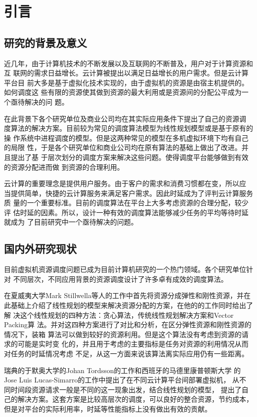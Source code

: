 

\chapter{引言}
\label{chap:introduction}


\section{研究的背景及意义}
近几年，由于计算机技术的不断发展以及互联网的不断普及，用户对于计算资源和互
联网的需求日益增长。云计算被提出以满足日益增长的用户需求。但是云计算平台目
前大多是基于虚拟化技术实现的，由于虚拟机的资源是由宿主机提供的。如何调度这
些有限的资源使其做到资源的最大利用或是资源间的分配公平成为一个亟待解决的问
题。

在此背景下各个研究单位及商业公司均在其实际应用条件下提出了自己的资源调
度算法的解决方案。目前较为常见的调度算法模型为线性规划模型或是基于原有的操
作系统中进程调度的模型。但是这两种常见的模型在多机虚拟环境下均有自己的局限
性，于是各个研究单位和商业公司均在原有算法的基础上做出了改进。并且提出了基
于层次划分的调度方案来解决这些问题。使得调度平台能够做到有效的资源分配进而做
到资源的合理利用。

云计算的重要理念是提供用户服务。由于客户的需求和消费习惯都在变，所以应
当提供简单，快捷的云计算服务来满足客户需求。因此时延成为了评判云计算服务质
量的一个重要标准。目前的调度算法在平台上大多考虑资源的合理分配，较少评
估时延的因素。所以，设计一种有效的调度算法能够减少任务的平均等待时延就成为
了目前研究中一个亟待解决的问题。

\section{国内外研究现状}
目前虚拟机资源调度问题已成为目前计算机研究的一个热门领域。各个研究单位针对
不同层次，不同应用背景的资源调度设计了许多卓有成效的调度算法。

在夏威夷大学Mark Stillwella等人的工作中首先将资源分成弹性和刚性资源，并在
此基础上介绍了线性规划的模型来解决资源分配的方案，在他的的工作同时给出了解
决这个线性规划的四种方法：贪心算法，传统线性规划解决方案和Vector Packing算
法。并对这四种方案进行了对比和分析，在区分弹性资源和刚性资源的情况下，装箱
算法可以做到较好的资源利用。但是这个算法没有考虑到资源的请求的可能是实时变
化的，并且用于考虑的主要指标是任务对资源的利用情况从而对任务的时延情况考虑
不足，从这一方面来说该算法离实际应用仍有一些距离。

瑞典的于默奥大学的Johan Tordsson的工作和西班牙的马德里康普顿斯大学
的Jose Luis Lucas-Simarro的工作中提出了在不同云计算平台间部署虚拟机，
从不同时间段资源请求一般是不同的这一现象出发，结合线性规划的模型，
提出了自己的解决方案。这套方案是比较高层次的调度，可以良好的整合资源，节约成本，
但是对平台的实际利用率，时延等性能指标上没有做出有效的贡献。

